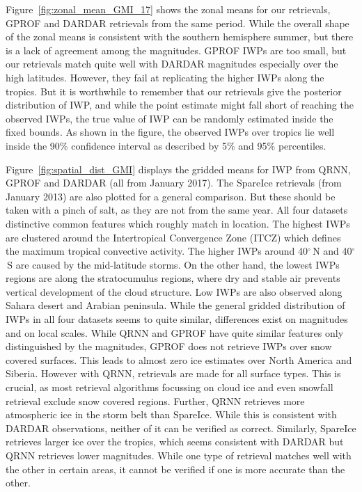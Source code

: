 \documentclass[amt, manuscript]{copernicus}
\begin{document}
Figure~\ref{fig:zonal_mean_GMI_17} shows the zonal means for our retrievals, GPROF and DARDAR retrievals from the same period. While the overall shape of the zonal means is consistent with the southern hemisphere summer, but there is a lack of agreement among the magnitudes. GPROF IWPs are too small, but our retrievals match quite well with DARDAR magnitudes especially over the high latitudes. However, they fail at replicating the higher IWPs along the tropics. But it is worthwhile to remember that our retrievals give the posterior distribution of IWP, and while the point estimate might fall short of reaching the observed IWPs, the true value of IWP can be randomly estimated inside the fixed bounds. As shown in the figure, the observed IWPs over tropics lie well inside the 90\% confidence interval as described by 5\% and 95\% percentiles.
  

Figure~\ref{fig:spatial_dist_GMI} displays the gridded means for IWP from QRNN, GPROF and DARDAR (all from January 2017). The SpareIce retrievals (from January 2013) are also plotted for a general comparison. But these should be taken with a pinch of salt, as they are not from the same year. All four datasets distinctive common features which roughly match in location. The highest IWPs are clustered around the Intertropical  Convergence Zone (ITCZ) which defines the maximum tropical convective activity. The higher IWPs around 40$^\circ$\,N and 40$^\circ$\,S are caused by the mid-latitude storms. On the other hand, the lowest IWPs regions are along the stratocumulus regions, where dry and stable air prevents vertical development of the cloud structure. Low IWPs are also observed along Sahara desert and Arabian peninsula. While the general gridded distribution of IWPs in all four datasets seems to quite similar, differences exist on magnitudes and on local scales. While QRNN and GPROF have quite similar features only distinguished by the magnitudes, GPROF does not retrieve IWPs over snow covered surfaces. This leads to almost zero ice estimates over North America and Siberia. However with QRNN, retrievals are made for all surface types. This is crucial, as most retrieval algorithms focussing on cloud ice and even snowfall retrieval \citep{rysman:slalom:18} exclude snow covered regions. Further, QRNN retrieves more atmospheric ice in the storm belt than SpareIce. While this is consistent with DARDAR observations, neither of it can be verified as correct. Similarly, SpareIce retrieves larger ice over the tropics, which seems consistent with DARDAR but QRNN retrieves lower magnitudes. While one type of retrieval matches well with the other in certain areas, it cannot be verified if one is more accurate than the other.  
\end{document}
